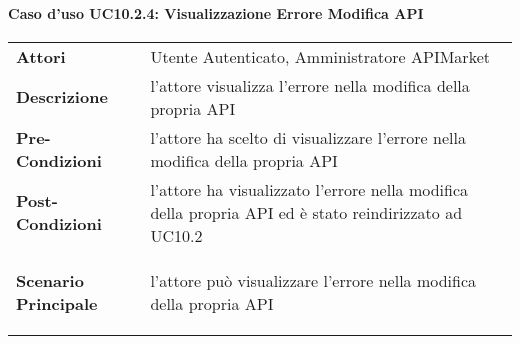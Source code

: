 \paragraph{Caso d'uso UC10.2.4: Visualizzazione Errore Modifica API}
\label{UC10.2.4}

\renewcommand*{\arraystretch}{1.6}
\begin{longtable}{ l | p{11cm}}
	\hline
	\rowcolor{Gray}
	\multicolumn{2}{c}{UC10.2.4: Visualizzazione Errore Modifica API} \\
	\hline
	\textbf{Attori} &Utente Autenticato, Amministratore APIMarket \\
	\textbf{Descrizione} &  l'attore visualizza l'errore nella modifica della propria API\\
	\textbf{Pre-Condizioni} & l'attore ha scelto di visualizzare l'errore nella modifica della propria API\\
	\textbf{Post-Condizioni}& l'attore ha visualizzato l'errore nella modifica della propria API ed è stato reindirizzato ad UC10.2\\
	\textbf{Scenario Principale} & \begin{enumerate*}[label=(\arabic*.),itemjoin={\newline}]
		\item l'attore può visualizzare l'errore nella modifica della propria API
	\end{enumerate*}\\
\end{longtable}


